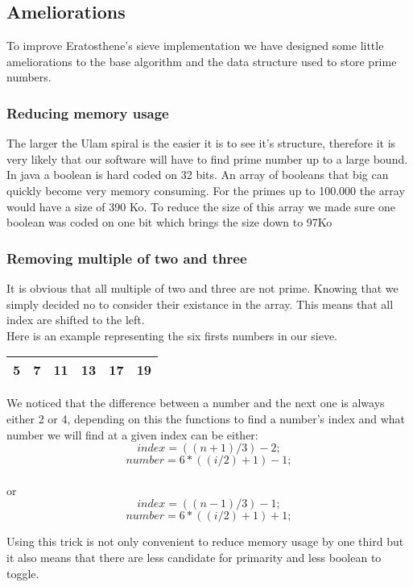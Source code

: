\documentclass[a4paper,12pt]{article}
\begin{document}
\subsection{Ameliorations}

To improve Eratosthene's sieve implementation we have designed some little ameliorations to the base algorithm and the data structure used to store prime numbers.

\subsubsection{Reducing memory usage}
The larger the Ulam spiral is the easier it is to see it's structure, therefore it is very likely that our software will have to find prime number up to a large bound.\\In java a boolean is hard coded on 32 bits. An array of booleans that big can quickly become very memory consuming. For the primes up to 100.000 the array would have a size of 390 Ko. To reduce the size of this array we made sure one boolean was coded on one bit which brings the size down to 97Ko

\subsubsection{Removing multiple of two and three }
It is obvious that all multiple of two and three are not prime. Knowing that we simply decided no to consider their existance in the array. This means that all index are shifted to the left.\\ Here is an example representing the six firsts numbers in our sieve.

\begin{center}
   \begin{tabular}{ |*{6}{c|} }
     \hline
     5 & 7 & 11 & 13 & 17 & 19 \\ \hline
     
   \end{tabular}
\end{center}  

 We noticed that the difference between a number and the next one is always either 2 or 4, depending on this the functions to find a number's index and what number we will find at a given index can be either: $$index = ((n + 1) / 3) - 2;$$ $$number = 6 * ((i / 2) + 1) - 1;$$ \\or $$index = ((n - 1) / 3) - 1;$$ $$number = 6 * ((i / 2) + 1) + 1;$$

Using this trick is not only convenient to reduce memory usage by one third but it also means that there are less candidate for primarity and less boolean to toggle. 
\end{document}
